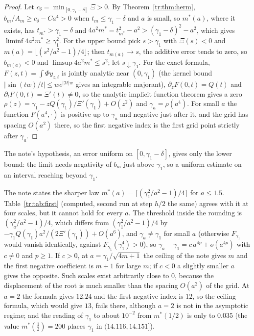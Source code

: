 \begin{proof}
Let $c_\delta=\min_{[0,\gamma_1-\delta]}\Xi>0$. By Theorem~\ref{tr:thm:herm}, $b_m/A_m\ge c_\delta-Ca^4>0$ when $t_m\le\gamma_1-\delta$ and $a$ is small, so $m^*(a)$, where it exists, has $t_{m^*}>\gamma_1-\delta$ and $4a^2m^*=t_{m^*}^2-a^2>(\gamma_1-\delta)^2-a^2$, which gives $\liminf4a^2m^*\ge\gamma_1^2$. For the upper bound pick $s>\gamma_1$ with $\Xi(s)<0$ and $m(a)=\lfloor(s^2/a^2-1)/4\rfloor$; then $t_{m(a)}\to s$, the additive error tends to zero, so $b_{m(a)}<0$ and $\limsup4a^2m^*\le s^2$; let $s\downarrow\gamma_1$. For the exact formula, $F(z,t)=\int\Phi y_{z,t}$ is jointly analytic near $(0,\gamma_1)$ (the kernel bound $|\sin(tw)/t|\le we^{|\Im t|w}$ gives an integrable majorant), $\partial_zF(0,t)=Q(t)$ and $\partial_tF(0,t)=\Xi'(t)\ne0$, so the analytic implicit function theorem gives a zero $\rho(z)=\gamma_1-zQ(\gamma_1)/\Xi'(\gamma_1)+O(z^2)$ and $\gamma_a=\rho(a^4)$. For small $a$ the function $F(a^4,\cdot)$ is positive up to $\gamma_a$ and negative just after it, and the grid has spacing $O(a^2)$ there, so the first negative index is the first grid point strictly after $\gamma_a$.
\end{proof}

The note's hypothesis, an error uniform on $[0,\gamma_1-\delta]$, gives only the lower bound: the limit needs negativity of $b_m$ just above $\gamma_1$, so a uniform estimate on an interval reaching beyond $\gamma_1$.

The note states the sharper law $m^*(a)=\lceil(\gamma_1^2/a^2-1)/4\rceil$ for $a\le1.5$. Table~\ref{tr:tab:first} (computed, second run at step $h/2$ the same) agrees with it at four scales, but it cannot hold for every $a$. The threshold inside the rounding is $(\gamma_a^2/a^2-1)/4$, which differs from $(\gamma_1^2/a^2-1)/4$ by $-\gamma_1Q(\gamma_1)a^2/(2\Xi'(\gamma_1))+O(a^6)$, and $\gamma_a\ne\gamma_1$ for small $a$ (otherwise $F_{\gamma_1}$ would vanish identically, against $F_{\gamma_1}(\gamma_1^4)>0$), so $\gamma_a-\gamma_1=c\,a^{4p}+o(a^{4p})$ with $c\ne0$ and $p\ge1$. If $c>0$, at $a=\gamma_1/\sqrt{4m+1}$ the ceiling of the note gives $m$ and the first negative coefficient is $m+1$ for large $m$; if $c<0$ a slightly smaller $a$ gives the opposite. Such scales exist arbitrarily close to $0$, because the displacement of the root is much smaller than the spacing $O(a^2)$ of the grid. At $a=2$ the formula gives $12.24$ and the first negative index is $12$, so the ceiling formula, which would give $13$, fails there, although $a=2$ is not in the asymptotic regime; and the reading of $\gamma_1$ to about $10^{-2}$ from $m^*(1/2)$ is only to $0.035$ (the value $m^*(\frac12)=200$ places $\gamma_1$ in $(14.116,14.151]$).

